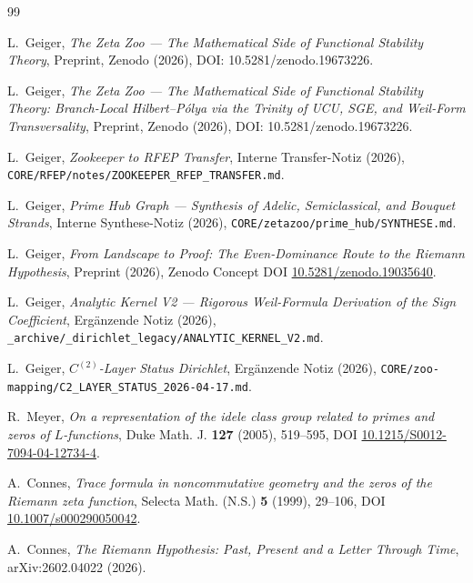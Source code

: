 \documentclass[11pt,a4paper]{article}
\theoremstyle{plain}
\theoremstyle{definition}
\begin{document}
\begin{thebibliography}{99}

L.~Geiger,
\textit{The Zeta Zoo --- The Mathematical Side of Functional
Stability Theory},
Preprint, Zenodo (2026), DOI: 10.5281/zenodo.19673226.

L.~Geiger,
\textit{The Zeta Zoo --- The Mathematical Side of Functional
Stability Theory: Branch-Local Hilbert--P\'olya via the Trinity of
UCU, SGE, and Weil-Form Transversality},
Preprint, Zenodo (2026), DOI: 10.5281/zenodo.19673226.


L.~Geiger,
\textit{Zookeeper to RFEP Transfer},
Interne Transfer-Notiz (2026),
  \texttt{CORE/RFEP/notes/ZOOKEEPER\_RFEP\_TRANSFER.md}.

L.~Geiger,
\textit{Prime Hub Graph --- Synthesis of Adelic, Semiclassical,
and Bouquet Strands},
Interne Synthese-Notiz (2026),
\texttt{CORE/zetazoo/prime\_hub/SYNTHESE.md}.

L.~Geiger,
\textit{From Landscape to Proof: The Even-Dominance Route to the
Riemann Hypothesis},
Preprint (2026),
Zenodo Concept DOI \href{https://doi.org/10.5281/zenodo.19035640}{10.5281/zenodo.19035640}.

L.~Geiger,
\textit{Analytic Kernel V2 --- Rigorous Weil-Formula Derivation
of the Sign Coefficient},
Ergänzende Notiz (2026),
\texttt{\_archive/\_dirichlet\_legacy/ANALYTIC\_KERNEL\_V2.md}.

L.~Geiger,
\textit{$C^{(2)}$-Layer Status Dirichlet},
Ergänzende Notiz (2026),
\texttt{CORE/zoo-mapping/C2\_LAYER\_STATUS\_2026-04-17.md}.

R.~Meyer,
\textit{On a representation of the idele class group related to
primes and zeros of $L$-functions},
Duke Math. J. \textbf{127} (2005), 519--595,
DOI \href{https://doi.org/10.1215/S0012-7094-04-12734-4}{10.1215/S0012-7094-04-12734-4}.

A.~Connes,
\textit{Trace formula in noncommutative geometry and the zeros of
the Riemann zeta function},
Selecta Math. (N.S.) \textbf{5} (1999), 29--106,
DOI \href{https://doi.org/10.1007/s000290050042}{10.1007/s000290050042}.

A.~Connes,
\textit{The Riemann Hypothesis: Past, Present and a Letter Through Time},
arXiv:2602.04022 (2026).


\end{thebibliography}
\end{document}
